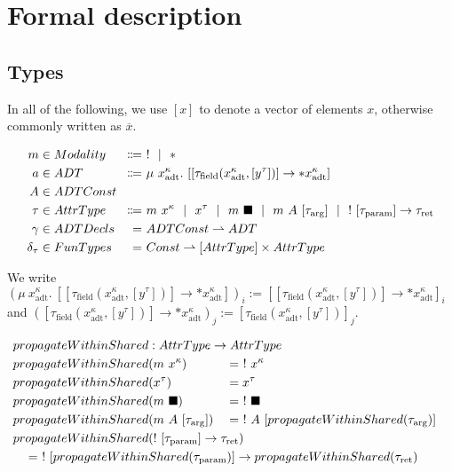 \chapter{Formal description}\label{sec:theory}

\newcommand{\sep}{\ \ |\ \ }
\newcommand{\icode}[1]{\textrm{\lstinline[language=ir-if]|#1|}}

\section{Types}
In all of the following, we use $[x]$ to denote a vector of elements $x$, otherwise commonly written as $\overline{x}$.

\begin{alignat*}{2}
  m &\in Modality &\Coloneqq&\ ! \sep * \\
  a &\in ADT &\Coloneqq&\ \mu\ x^\kappa_\text{adt}.\ [[\tau_\text{field}(x^\kappa_\text{adt}, [y^\tau])] \to *x^\kappa_\text{adt}] \\
  A &\in \mathrlap{ADTConst} \\
  \tau &\in AttrType &\Coloneqq&\ m\ x^\kappa \sep x^\tau \sep m\ \blacksquare \sep m\ A\ [\tau_\text{arg}] \sep !\ [\tau_\text{param}] \to \tau_\text{ret} \\
  \gamma &\in ADTDecls &=&\ ADTConst \rightharpoonup ADT \\
  \delta_\tau &\in FunTypes &=&\ Const \rightharpoonup [AttrType] \times AttrType
\end{alignat*}

We write $(\mu\ x^\kappa_\text{adt}.\ [[\tau_\text{field}(x^\kappa_\text{adt}, [y^\tau])] \to *x^\kappa_\text{adt}])_i := [[\tau_\text{field}(x^\kappa_\text{adt}, [y^\tau])] \to *x^\kappa_\text{adt}]_i$ and $([\tau_\text{field}(x^\kappa_\text{adt}, [y^\tau])] \to *x^\kappa_\text{adt})_j := [\tau_\text{field}(x^\kappa_\text{adt}, [y^\tau])]_j$.

\begin{alignat*}{3}
  propagateWithinShared &: \mathrlap{AttrType \to AttrType} \\
  propagateWithinShared&(m\ x^\kappa) &&=\ !\ x^\kappa \\
  propagateWithinShared&(x^\tau) &&= x^\tau \\
  propagateWithinShared&(m\ \blacksquare) &&=\ !\ \blacksquare \\
  propagateWithinShared&(m\ A\ [\tau_\text{arg}]) &&=\ !\ A\ [propagateWithinShared(\tau_\text{arg})] \\
  propagateWithinShared&\mathrlap{(!\ [\tau_\text{param}] \to \tau_\text{ret})} \\
  \mathclap{\hspace{12em}= \ !\ [propagateWithinShared(\tau_\text{param})] \to propagateWithinShared(\tau_\text{ret})}
\end{alignat*}

